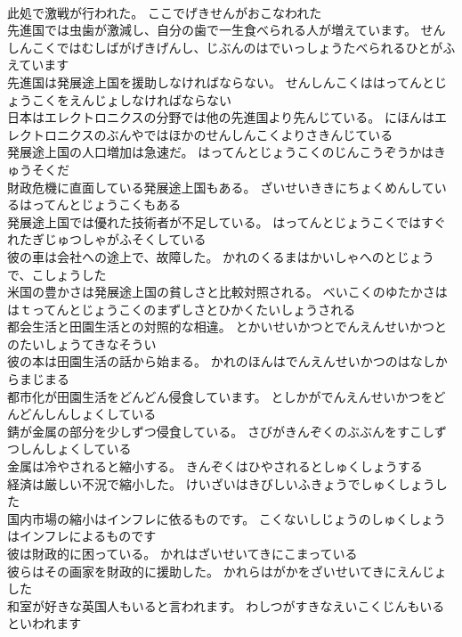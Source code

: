 \documentclass[8pt]{extreport}
\begin{document}
\begin{CJK}{UTF8}{min}
\\	此処で激戦が行われた。	ここでげきせんがおこなわれた 
\\	先進国では虫歯が激減し、自分の歯で一生食べられる人が増えています。	せんしんこくではむしばがげきげんし、じぶんのはでいっしょうたべられるひとがふえています 
\\	先進国は発展途上国を援助しなければならない。	せんしんこくははってんとじょうこくをえんじょしなければならない 
\\	日本はエレクトロニクスの分野では他の先進国より先んじている。	にほんはエレクトロニクスのぶんやではほかのせんしんこくよりさきんじている 
\\	発展途上国の人口増加は急速だ。	はってんとじょうこくのじんこうぞうかはきゅうそくだ 
\\	財政危機に直面している発展途上国もある。	ざいせいききにちょくめんしているはってんとじょうこくもある 
\\	発展途上国では優れた技術者が不足している。	はってんとじょうこくではすぐれたぎじゅつしゃがふそくしている 
\\	彼の車は会社への途上で、故障した。	かれのくるまはかいしゃへのとじょうで、こしょうした 
\\	米国の豊かさは発展途上国の貧しさと比較対照される。	べいこくのゆたかさははｔってんとじょうこくのまずしさとひかくたいしょうされる 
\\	都会生活と田園生活との対照的な相違。	とかいせいかつとでんえんせいかつとのたいしょうてきなそうい 
\\	彼の本は田園生活の話から始まる。	かれのほんはでんえんせいかつのはなしからまじまる 
\\	都市化が田園生活をどんどん侵食しています。	としかがでんえんせいかつをどんどんしんしょくしている 
\\	錆が金属の部分を少しずつ侵食している。	さびがきんぞくのぶぶんをすこしずつしんしょくしている 
\\	金属は冷やされると縮小する。	きんぞくはひやされるとしゅくしょうする 
\\	経済は厳しい不況で縮小した。	けいざいはきびしいふきょうでしゅくしょうした 
\\	国内市場の縮小はインフレに依るものです。	こくないしじょうのしゅくしょうはインフレによるものです 
\\	彼は財政的に困っている。	かれはざいせいてきにこまっている 
\\	彼らはその画家を財政的に援助した。	かれらはがかをざいせいてきにえんじょした 
\\	和室が好きな英国人もいると言われます。	わしつがすきなえいこくじんもいるといわれます 

\end{CJK}
\end{document}
